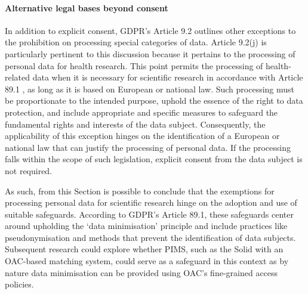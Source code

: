 \paragraph{Alternative legal bases beyond consent}
In addition to explicit consent, GDPR's Article 9.2 \citeyearpar{noauthor_regulation_2016} outlines other exceptions to the prohibition on processing special categories of data.
Article 9.2(j) is particularly pertinent to this discussion because it pertains to the processing of personal data for health research.
This point permits the processing of health-related data when it is necessary for scientific research in accordance with Article 89.1 \citeyearpar{noauthor_regulation_2016}, as long as it is based on European or national law.
Such processing must be proportionate to the intended purpose, uphold the essence of the right to data protection, and include appropriate and specific measures to safeguard the fundamental rights and interests of the data subject.
Consequently, the applicability of this exception hinges on the identification of a European or national law that can justify the processing of personal data.
If the processing falls within the scope of such legislation, explicit consent from the data subject is not required.

As such, from this Section is possible to conclude that the exemptions for processing personal data for scientific research hinge on the adoption and use of suitable safeguards.
According to GDPR's Article 89.1, these safeguards center around upholding the `data minimisation' principle and include practices like pseudonymisation and methods that prevent the identification of data subjects.
Subsequent research could explore whether PIMS, such as the Solid with an OAC-based matching system, could serve as a safeguard in this context as by nature data minimisation can be provided using OAC's fine-grained access policies.